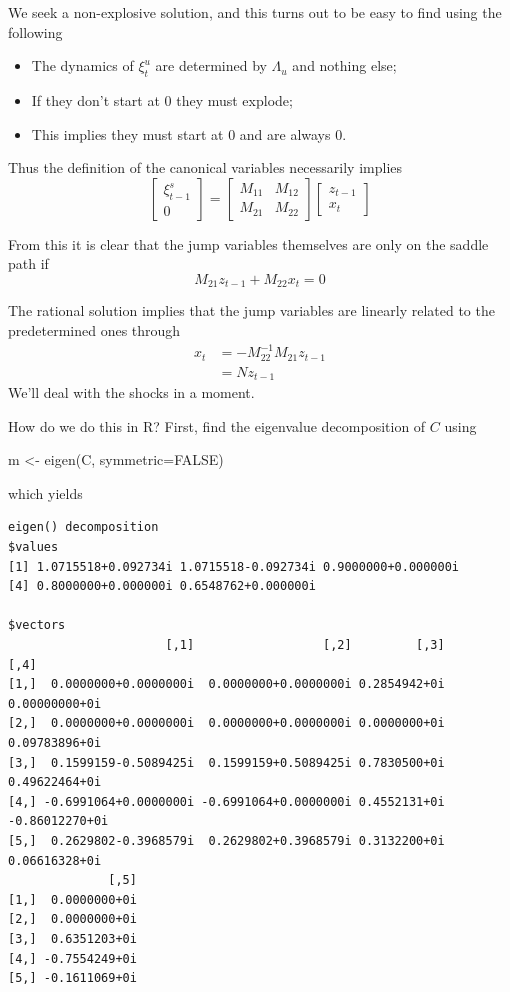 \documentclass[
  letterpaper,
]{book}
\newenvironment{Shaded}{\begin{snugshade}}{\end{snugshade}}
\newcommand{\AttributeTok}[1]{\textcolor[rgb]{0.40,0.45,0.13}{#1}}
\newcommand{\ConstantTok}[1]{\textcolor[rgb]{0.56,0.35,0.01}{#1}}
\newcommand{\FunctionTok}[1]{\textcolor[rgb]{0.28,0.35,0.67}{#1}}
\newcommand{\NormalTok}[1]{\textcolor[rgb]{0.00,0.23,0.31}{#1}}
\newcommand{\OtherTok}[1]{\textcolor[rgb]{0.00,0.23,0.31}{#1}}
\providecommand{\tightlist}{%
  \setlength{\itemsep}{0pt}\setlength{\parskip}{0pt}}\usepackage{longtable,booktabs,array}
\begin{document}
We seek a non-explosive solution, and this turns out to be easy to find
using the following

\begin{itemize}
\tightlist
\item
  The dynamics of \(\xi_t^u\) are determined by \(\Lambda_u\) and
  nothing else;
\item
  If they don't start at \(0\) they must explode;
\item
  This implies they must start at \(0\) and are always \(0\).
\end{itemize}

Thus the definition of the canonical variables necessarily implies \[
\begin{bmatrix} \xi_{t-1}^s \\  0 \end{bmatrix}
  =  \begin{bmatrix} M_{11} & M_{12} \\  M_{21} & M_{22} \end{bmatrix}
      \begin{bmatrix} z_{t-1} \\  x_t \end{bmatrix}
\]

From this it is clear that the jump variables themselves are only on the
saddle path if \[
   M_{21} z_{t-1} + M_{22} x_t = 0
\]

The rational solution implies that the jump variables are linearly
related to the predetermined ones through \begin{align}
x_t &= -M_{22}^{-1} M_{21}z_{t-1} \\
    &= N z_{t-1}
\end{align} We'll deal with the shocks in a moment.

How do we do this in R? First, find the eigenvalue decomposition of
\(C\) using

\begin{Shaded}
\begin{Highlighting}[]
\NormalTok{m }\OtherTok{\textless{}{-}} \FunctionTok{eigen}\NormalTok{(C, }\AttributeTok{symmetric=}\ConstantTok{FALSE}\NormalTok{)}
\end{Highlighting}
\end{Shaded}

which yields

\begin{verbatim}
eigen() decomposition
$values
[1] 1.0715518+0.092734i 1.0715518-0.092734i 0.9000000+0.000000i
[4] 0.8000000+0.000000i 0.6548762+0.000000i

$vectors
                      [,1]                  [,2]         [,3]           [,4]
[1,]  0.0000000+0.0000000i  0.0000000+0.0000000i 0.2854942+0i  0.00000000+0i
[2,]  0.0000000+0.0000000i  0.0000000+0.0000000i 0.0000000+0i  0.09783896+0i
[3,]  0.1599159-0.5089425i  0.1599159+0.5089425i 0.7830500+0i  0.49622464+0i
[4,] -0.6991064+0.0000000i -0.6991064+0.0000000i 0.4552131+0i -0.86012270+0i
[5,]  0.2629802-0.3968579i  0.2629802+0.3968579i 0.3132200+0i  0.06616328+0i
              [,5]
[1,]  0.0000000+0i
[2,]  0.0000000+0i
[3,]  0.6351203+0i
[4,] -0.7554249+0i
[5,] -0.1611069+0i
\end{verbatim}
\end{document}
